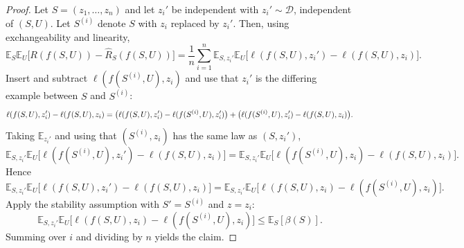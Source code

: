 \documentclass[10pt,a4paper]{amsart}
\begin{document}
\begin{proof}
	Let $S=(z_1,\dots,z_n)$ and let $z_i'$ be independent with $z_i'\sim\mathcal{D}$, independent of $(S,U)$.
	Let $S^{(i)}$ denote $S$ with $z_i$ replaced by $z_i'$.
	Then, using exchangeability and linearity,
	\[
	\mathbb{E}_S\mathbb{E}_U\big[R(f(S,U))-\widehat{R}_S(f(S,U))\big]
	=
	\frac{1}{n}\sum_{i=1}^n
	\mathbb{E}_{S,z_i'}\mathbb{E}_U\big[\ell(f(S,U),z_i')-\ell(f(S,U),z_i)\big].
	\]
	Insert and subtract $\ell(f(S^{(i)},U),z_i)$ and use that $z_i'$ is the differing example between $S$ and $S^{(i)}$:
	\[
	\ell(f(S,U),z_i')-\ell(f(S,U),z_i)
	=
	\big(\ell(f(S,U),z_i')-\ell(f(S^{(i)},U),z_i')\big)\\
	+
	\big(\ell(f(S^{(i)},U),z_i')-\ell(f(S,U),z_i)\big).
	\]
	Taking $\mathbb{E}_{z_i'}$ and using that $(S^{(i)},z_i)$ has the same law as $(S,z_i')$,
	\[
	\mathbb{E}_{S,z_i'}\mathbb{E}_U\big[\ell(f(S^{(i)},U),z_i')-\ell(f(S,U),z_i)\big]
	=
	\mathbb{E}_{S,z_i'}\mathbb{E}_U\big[\ell(f(S^{(i)},U),z_i)-\ell(f(S,U),z_i)\big].
	\]
	Hence
	\[
	\mathbb{E}_{S,z_i'}\mathbb{E}_U\big[\ell(f(S,U),z_i')-\ell(f(S,U),z_i)\big]
	=
	\mathbb{E}_{S,z_i'}\mathbb{E}_U\big[\ell(f(S,U),z_i)-\ell(f(S^{(i)},U),z_i)\big].
	\]
	Apply the stability assumption with $S'\!=\!S^{(i)}$ and $z\!=\!z_i$:
	\[
	\mathbb{E}_{S,z_i'}\mathbb{E}_U\big[\ell(f(S,U),z_i)-\ell(f(S^{(i)},U),z_i)\big]
	\le
	\mathbb{E}_S[\beta(S)].
	\]
	Summing over $i$ and dividing by $n$ yields the claim.
\end{proof}
\end{document}

